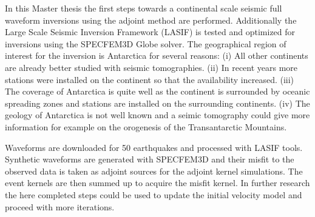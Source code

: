 
In this Master thesis the first steps towards a continental scale seismic full waveform inversions 
using the adjoint method are performed. Additionally the Large Scale Seismic Inversion Framework 
(LASIF) is tested and optimized for inversions using the SPECFEM3D Globe solver.
The geographical region of interest for the inversion is Antarctica for several reasons:
(i) All other continents are already better studied with seismic tomographies.
(ii) In recent years more stations were installed on the continent so that the availability increased.
(iii) The coverage of Antarctica is quite well as the continent is surrounded by oceanic spreading zones 
and stations are installed on the surrounding continents.
(iv) The geology of Antarctica is not well known and a seimic tomography could give more information
for example on the orogenesis of the Transantarctic Mountains.

Waveforms are downloaded for 50 earthquakes and processed with LASIF tools. 
Synthetic waveforms are generated with SPECFEM3D and their misfit to the observed data is taken as
adjoint sources for the adjoint kernel simulations. 
The event kernels are then summed up to acquire the misfit kernel.
In further research the here completed steps could be used to update the initial velocity model and 
proceed with more iterations.

 




